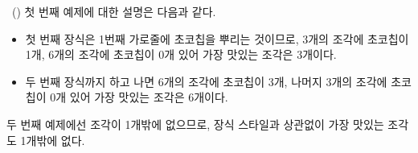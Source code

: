 \begin{problem}{\kcpcprobcake\ (\kcpcprobcakeshort)}
    \Explanation
    첫 번째 예제에 대한 설명은 다음과 같다.
    \begin{itemize}
    \item 첫 번째 장식은 1번째 가로줄에 초코칩을 뿌리는 것이므로, 3개의 조각에 초코칩이 1개, 6개의 조각에 초코칩이 0개 있어 가장 맛있는 조각은 3개이다.
    
    \item 두 번째 장식까지 하고 나면 6개의 조각에 초코칩이 3개, 나머지 3개의 조각에 초코칩이 0개 있어 가장 맛있는 조각은 6개이다.
    \end{itemize}
    
    두 번째 예제에선 조각이 1개밖에 없으므로, 장식 스타일과 상관없이 가장 맛있는 조각도 1개밖에 없다.
\end{problem}

